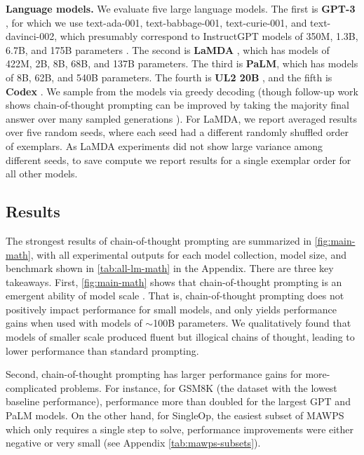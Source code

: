 \textbf{Language models.} We evaluate five large language models. The first is \textbf{GPT-3} \citep{brown2020language}, for which we use text-ada-001, text-babbage-001, text-curie-001, and text-davinci-002, which presumably correspond to InstructGPT models of 350M, 1.3B, 6.7B, and 175B parameters \citep{ouyang2022training}. The second is \textbf{LaMDA} \citep{thoppilan2022lamda}, which has models of 422M, 2B, 8B, 68B, and 137B parameters. The third is \textbf{PaLM}, which has models of 8B, 62B, and 540B parameters. The fourth is \textbf{UL2 20B} \citep{tay2022unifying}, and the fifth is \textbf{Codex} \citep[][code-davinci-002 in the OpenAI API]{chen2021evaluating}. We sample from the models via greedy decoding (though follow-up work shows chain-of-thought prompting can be improved by taking the majority final answer over many sampled generations \citep{wang2022self}). For LaMDA, we report averaged results over five random seeds, where each seed had a different randomly shuffled order of exemplars. As LaMDA experiments did not show large variance among different seeds, to save compute we report results for a single exemplar order for all other models.

\subsection{Results}
The strongest results of chain-of-thought prompting are summarized in \cref{fig:main-math}, with all experimental outputs for each model collection, model size, and benchmark shown in \cref{tab:all-lm-math} in the Appendix. There are three key takeaways. First, \cref{fig:main-math} shows that chain-of-thought prompting is an emergent ability of model scale \citep{wei2022emergent}. That is, chain-of-thought prompting does not positively impact performance for small models, and only yields performance gains when used with models of $\sim$100B parameters. We qualitatively found that models of smaller scale produced fluent but illogical chains of thought, leading to lower performance than standard prompting.


Second, chain-of-thought prompting has larger performance gains for more-complicated problems. For instance, for GSM8K (the dataset with the lowest baseline performance), performance more than doubled for the largest GPT and PaLM models. On the other hand, for SingleOp, the easiest subset of MAWPS which only requires a single step to solve, performance improvements were either negative or very small (see Appendix \cref{tab:mawps-subsets}).

